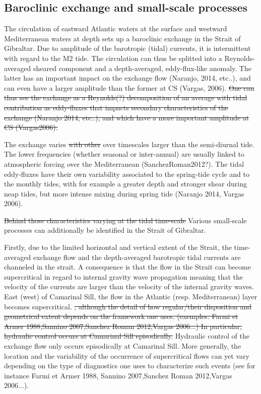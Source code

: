 \subsection{Baroclinic exchange and small-scale processes}


The circulation of eastward Atlantic waters at the surface and westward Mediterranean waters at depth sets up a baroclinic exchange in the Strait of Gibraltar. Due to amplitude of the barotropic \color{blue}(tidal) \color{black} currents, it is intermittent with regard to the M2 tide. \color{blue}The circulation can thus be splitted into a Reynolds-averaged sheared component and a depth-averaged, eddy-flux-like anomaly. The latter has an important impact on the exchange flow (Naranjo, 2014, etc..), and can even have a larger  amplitude than the former at CS (Vargas, 2006). \color{black}
\sout{One can thus see the exchange as a Reynolds(?) decomposition of an average with tidal contribution as eddy-fluxes that impacts secondary characteristics of the exchange (Naranjo 2014, etc..), and which have a more important amplitude at CS (Vargas2006).}  

The exchange varies \sout{with other} \color{blue}over timescales larger than   the semi-diurnal tide. The lower frequencies (whether seasonal or inter-annual) are usually linked to atmospheric forcing over the Mediterranean (SanchezRoman2012?). \color{black} The tidal eddy-fluxes have their own variability associated to the spring-tide cycle and to the monthly tides, with for example a greater depth and stronger shear during neap tides, but more intense mixing during spring tide (Naranjo 2014, Vargas 2006).

\sout{Behind those characteristics varying at the tidal time-scale} \color{blue}Various small-scale processes can additionally be identified in the Strait of Gibraltar. \color{black}

Firstly, due to the limited horizontal and vertical extent of the Strait, \color{blue} the time-averaged exchange flow and the depth-averaged barotropic tidal currents are channeled in the strait. \color{black} A consequence is that the flow in the Strait can become supercritical in regard to internal gravity wave propagation \color{blue} meaning that the velocity of the currents are larger than the velocity of the internal gravity waves. \color{black} East (west) of Camarinal Sill, the flow in the Atlantic (resp. Mediterranean) layer becomes supercritical.
\sout{, although the detail of how regular/their disposition and geometrical extent depends on the framework one uses. (exemples: Farmi et Armer 1988,Sannino 2007,Sanchez Roman 2012,Vargas 2006...) In particular, hydraulic control occurs at Camarinal Sill episodically.}
 \color{blue} Hydraulic control of the exchange flow only occurs episodically at Camarinal Sill. More generally, the location and the variability of the occurrence of supercritical flows can yet vary depending on the type of diagnostics one uses to characterize such events (see for instance Farmi et Armer 1988, Sannino 2007,Sanchez Roman 2012,Vargas 2006...). \color{black}

